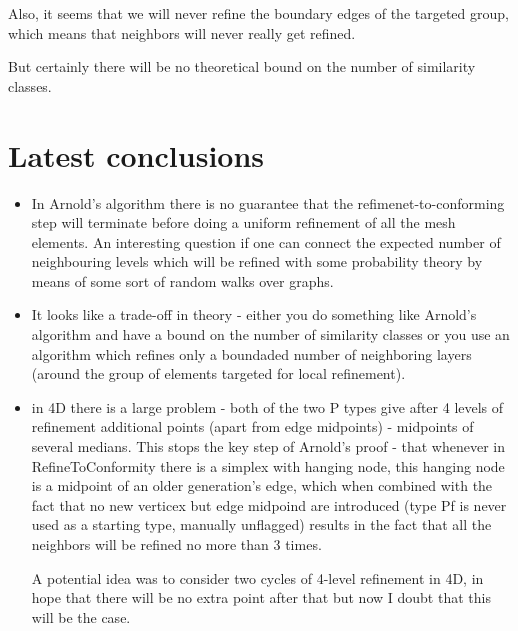 \documentclass[a4paper,12pt]{amsart}
\numberwithin{equation}{section}
\begin{document}
Also, it seems that we will never refine the boundary edges of the targeted group, which means that neighbors will never really get refined.

But certainly there will be no theoretical bound on the number of similarity classes.


\section{Latest conclusions}
\begin{itemize}
	\item In Arnold's algorithm there is no guarantee that the refimenet-to-conforming step will terminate before doing a uniform refinement of all the mesh elements. An interesting question if one can connect the expected number of neighbouring levels which will be refined with some probability theory by means of some sort of random walks over graphs.
	\item It looks like a trade-off in theory - either you do something like Arnold's algorithm and have a bound on the number of similarity classes or you use an algorithm which refines only a boundaded number of neighboring layers (around the group of elements targeted for local refinement).
	\item in 4D there is a large problem - both of the two P types give after 4 levels of refinement additional points (apart from edge midpoints) - midpoints of several medians. This stops the key step of Arnold's proof - that whenever in RefineToConformity there is a simplex with hanging node, this hanging node is a midpoint of an older generation's edge, which when combined with the fact that no new verticex but edge midpoind are introduced (type Pf is never used as a starting type, manually unflagged) results in the fact that all the neighbors will be refined no more than 3 times.
	
	A potential idea was to consider two cycles of 4-level refinement in 4D, in hope that there will be no extra point after that but now I doubt that this will be the case.
\end{itemize}
\end{document}
